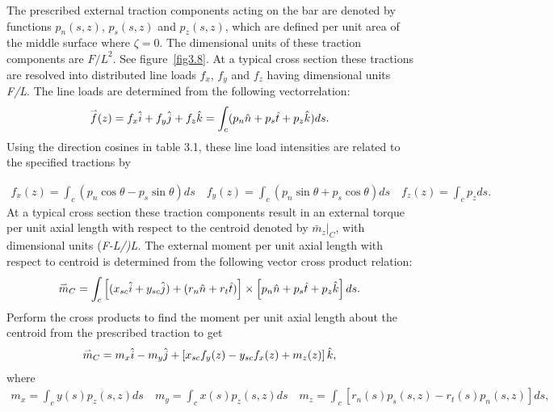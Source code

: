 \documentclass{AeroStructure-ERJohnson}
\def\harp#1{\smash{\mathord{\buildrel{\lower3pt\hbox{$\scriptscriptstyle\rightharpoonup$}}\over{#1}}}}
\begin{document}
The prescribed external traction components acting on the bar are denoted by functions $p_{n}(s, z)$, $p_{s}(s, z)$ and $p_{z}(s, z)$, which are defined per unit area of the middle surface where $\zeta=0$. The dimensional units of these traction components are ${F/L}^2$. See figure~\ref{fig3.8}. At a typical cross section these tractions are resolved into distributed line loads $f_{x}$, $f_{y}$ and $f_{z}$ having dimensional units \textit{F/L}. The line loads are determined from the following vector\break relation:
\begin{align}\label{eq3.41}
\harp{f}(z)=f_{x} \hat{i}+f_{y} \hat{j}+f_{z} \hat{k}=\int_{c}(p_{n} \hat{n}+p_{s} \hat{t}+p_{z} \hat{k}) d s.
\end{align}
Using the direction cosines in table 3.1, these line load intensities are related to the specified tractions by
{\def\thefigure{3.8}
}

\vspace*{-3pc}

\begin{align}\label{eq3.42}
f_{x}(z)=\int_{c}\left(p_{n} \cos \theta-p_{s} \sin \theta\right) d s \quad f_{y}(z)=\int_{c}\left(p_{n} \sin \theta+p_{s} \cos \theta\right) d s \quad f_{z}(z)=\int_{c} p_{z} d s.
\end{align}
At a typical cross section these traction components result in an external torque per unit axial length with respect to the centroid denoted by $\left.\bar{m}_{z}\right|_{C}$, with dimensional units (\textit{F-L/)L. }The external moment per unit axial length with respect to centroid is determined from the following vector cross product relation:
\begin{align}\label{eq3.43}
\harp{m}_{C}=\int_{c}\left[(x_{s c} \hat{i}+y_{sc} \hat{j})+(r_{n} \hat{n}+r_{t} \hat{t} )\right] \times\left[p_{n} \hat{n}+p_{s} \hat{t}+p_{z} \hat{k}\right] d s.
\end{align}
Perform the cross products to find the moment per unit axial length about the centroid from the prescribed traction to get
\begin{align}\label{eq3.44}
\harp{m}_{C} =m_{x} \hat{i}-m_{y} \hat{j}+\left[x_{sc} f_{y}(z)-y_{sc} f_{x}(z)+m_{z}(z)\right] \hat{k},
\end{align}
where
\begin{align}\label{eq3.45}
m_{x}=\int_{c} y(s) p_{z}(s, z) d s \quad m_{y}=\int_{c} x(s) p_{z}(s, z) d s \quad m_{z}=\int_{c}\left[r_{n}(s) p_{s}(s, z)-r_{t}(s) p_{n}(s, z)\right] d s,
\end{align}
\end{document}
